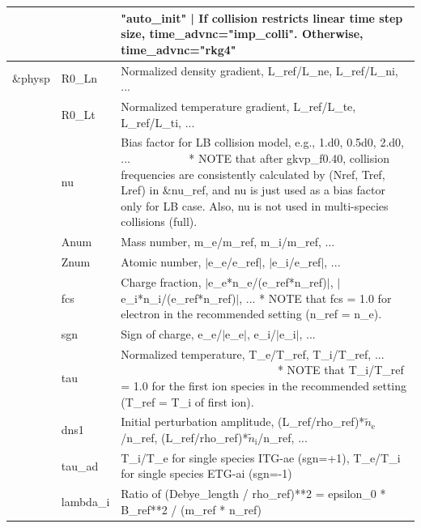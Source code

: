 \begin{longtable}{ l | l | p{10cm} }
          ~ &                ~ & "auto\_init" | If collision restricts linear time step size, time\_advnc="imp\_colli".
                                                      Otherwise, time\_advnc="rkg4"\\
  \hline
  \&physp & R0\_Ln & Normalized density gradient, L\_ref/L\_ne, L\_ref/L\_ni, ...\\
              \cline{2-3}
            ~ & R0\_Lt & Normalized temperature gradient, L\_ref/L\_te, L\_ref/L\_ti, ...\\
              \cline{2-3}
            ~ & nu & Bias factor for LB collision model, e.g., 1.d0, 0.5d0, 2.d0, ... ~~~~~~~~~
                         * NOTE that after gkvp\_f0.40, collision frequencies are consistently calculated by (Nref, Tref, Lref) in \&nu\_ref, 
                         and nu is just used as a bias factor only for LB case. Also, nu is not used in multi-species collisions (full). \\
              \cline{2-3}
            ~ & Anum & Mass number, m\_e/m\_ref, m\_i/m\_ref, ... \\
              \cline{2-3}
            ~ & Znum & Atomic number, $|$e\_e/e\_ref$|$, $|$e\_i/e\_ref$|$, ... \\
              \cline{2-3}
            ~ & fcs & Charge fraction, $|$e\_e*n\_e/(e\_ref*n\_ref)$|$, $|$e\_i*n\_i/(e\_ref*n\_ref)$|$, ...
                          * NOTE that fcs = 1.0 for electron in the recommended setting (n\_ref = n\_e).\\
              \cline{2-3}
            ~ & sgn & Sign of charge, e\_e/$|$e\_e$|$, e\_i/$|$e\_i$|$, ...\\
              \cline{2-3}
            ~ & tau & Normalized temperature, T\_e/T\_ref, T\_i/T\_ref, ... ~~~~~~~~~~~~~~~~~~~~~~~~~~~
                          * NOTE that T\_i/T\_ref = 1.0 for the first ion species in the recommended setting (T\_ref = T\_i of first ion).\\
              \cline{2-3}
            ~ & dns1 & Initial perturbation amplitude, (L\_ref/rho\_ref)*$\tilde{n}_\mathrm{e}$/n\_ref, 
                                                                    (L\_ref/rho\_ref)*$\tilde{n}_\mathrm{i}$/n\_ref, ... \\
              \cline{2-3}
            ~ & tau\_ad & T\_i/T\_e for single species ITG-ae (sgn=+1), T\_e/T\_i for single species ETG-ai (sgn=-1)\\
              \cline{2-3}
            ~ & lambda\_i & Ratio of (Debye\_length / rho\_ref)**2 = epsilon\_0 * B\_ref**2 / (m\_ref * n\_ref)\\

\end{longtable}
